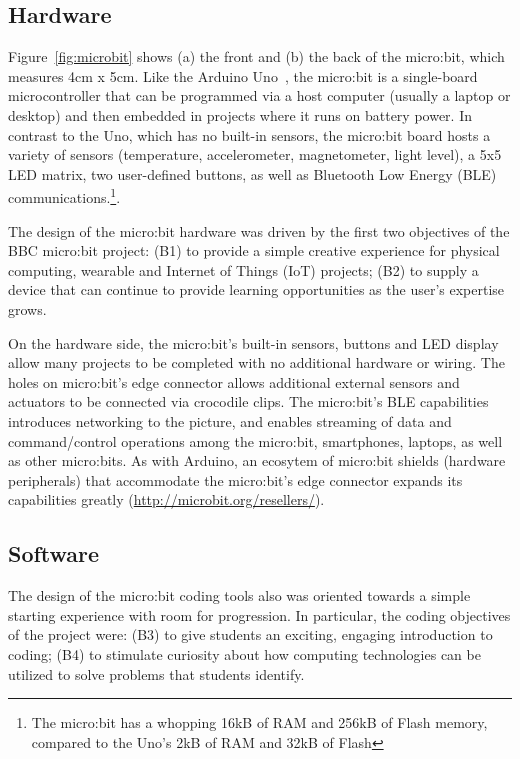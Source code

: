 \subsection{Hardware}

Figure~\ref{fig:microbit} shows (a) the front and (b) the back of the
micro:bit, which measures 4cm x 5cm. Like the Arduino Uno~\cite{Arduino}, 
the micro:bit is a single-board microcontroller 
that can be programmed via a host computer (usually a laptop or desktop)
and then embedded in projects where it runs on battery power.
In contrast to the Uno, which has no built-in sensors, the micro:bit 
board hosts a variety of sensors (temperature, accelerometer, magnetometer, 
light level), 
a 5x5 LED matrix, two user-defined buttons, as well as Bluetooth
Low Energy (BLE) communications.\footnote{The micro:bit has a whopping
16kB of RAM and 256kB of Flash memory, compared to the Uno's 2kB of 
RAM and 32kB of Flash}.

The design of the micro:bit hardware was driven by the
first two objectives of the BBC micro:bit project:
(B1) to provide a simple creative experience for physical computing, wearable and Internet of Things (IoT) projects;
(B2) to supply a device that can continue to provide learning opportunities as the user's expertise grows.

On the hardware side, the micro:bit's built-in sensors, buttons and LED display 
allow many projects to be completed with no additional hardware or wiring. 
The holes on micro:bit's edge
connector allows additional external sensors and actuators to be connected via crocodile clips.
The micro:bit's BLE capabilities introduces networking to the
picture, and enables streaming of data and command/control operations among the micro:bit, 
smartphones, laptops, as well as other micro:bits.
As with Arduino, an ecosytem of micro:bit shields
(hardware peripherals) that accommodate the micro:bit's edge
connector expands its capabilities greatly (\url{http://microbit.org/resellers/}).

\subsection{Software}

The design of the micro:bit coding tools also was oriented towards a 
simple starting experience with room for progression. In particular, the coding 
objectives of the project were: (B3)
to give students an exciting, engaging introduction to coding;
(B4) to stimulate curiosity about how computing technologies can be utilized 
  to solve problems that students identify. 

